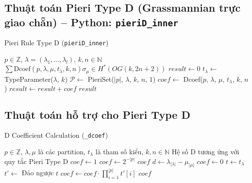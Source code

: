 
\subsection*{Thuật toán Pieri Type D (Grassmannian trực giao chẵn) -- Python: \texttt{pieriD\_inner}}

\begin{algorithm}[H]
\caption{Pieri Rule Type D (\texttt{pieriD\_inner})}
\begin{algorithmic}[1]
\REQUIRE $p \in \mathbb{Z}$, $\lambda = (\lambda_1, ..., \lambda_l)$, $k, n \in \mathbb{N}$
\ENSURE $\sum \text{Dcoef}(p,\lambda,\mu,t_\lambda,k,n) \sigma_\mu \in H^*(OG(k,2n+2))$
\STATE $result \gets 0$
\STATE $t_\lambda \gets$ TypeParameter($\lambda$, $k$)
\STATE $\mathcal{P} \gets$ PieriSet($|p|$, $\lambda$, $k$, $n$, $1$)
    \STATE $coef \gets$ Dcoef($p$, $\lambda$, $\mu$, $t_\lambda$, $k$, $n$)
    \STATE $result \gets result + coef$
\ENDFOR
\RETURN $result$
\end{algorithmic}
\end{algorithm}

\subsection*{Thuật toán hỗ trợ cho Pieri Type D}


\begin{algorithm}[H]
\caption{D Coefficient Calculation (\texttt{\_dcoef})}
\begin{algorithmic}[1]
\REQUIRE $p \in \mathbb{Z}$, $\lambda, \mu$ là các partition, $t_\lambda$ là tham số kiểu, $k, n \in \mathbb{N}$
\ENSURE Hệ số D tương ứng với quy tắc Pieri Type D
\STATE $coef \gets 1$
    \STATE $coef \gets 2^{-|p|}$
\ENDIF
\IF{$\lambda = \mu$}
    \RETURN $coef$
\ENDIF
\STATE $d \gets \lambda_{|\lambda|} - \mu_{|\mu|}$
    \STATE $coef \gets 0$
\ENDIF
{}
    \STATE $t \gets t_\lambda$
    \STATE $t' \gets$ Đảo ngược $t$
    \STATE $coef \gets coef \cdot \prod_{i=1}^{|p|} t'[i]$
\ENDIF
\RETURN $coef$
\end{algorithmic}
\end{algorithm}

